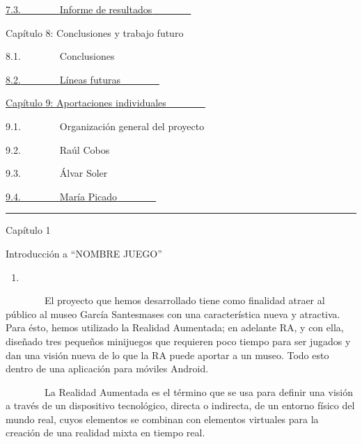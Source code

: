 \documentclass[]{article}
\begin{document}
\hyperref[h.1mrcu09]{7.3.}\hyperref[h.1mrcu09]{~~~~~~~~}\hyperref[h.1mrcu09]{Informe
de resultados}\hyperref[h.1mrcu09]{~~~~~~~~}

Capítulo 8: Conclusiones y trabajo futuro~~~~~~~~

8.1.~~~~~~~~Conclusiones~~~~~~~~

\hyperref[h.111kx3o]{8.2.}\hyperref[h.111kx3o]{~~~~~~~~}\hyperref[h.111kx3o]{Líneas
futuras}\hyperref[h.111kx3o]{~~~~~~~~}

\hyperref[h.3l18frh]{Capítulo 9: Aportaciones
individuales}\hyperref[h.3l18frh]{~~~~~~~~}

9.1.~~~~~~~~Organización general del proyecto~~~~~~~~

9.2.~~~~~~~~Raúl Cobos~~~~~~~~

9.3.~~~~~~~~Álvar Soler~~~~~~~~

\hyperref[h.1egqt2p]{9.4.}\hyperref[h.1egqt2p]{~~~~~~~~}\hyperref[h.1egqt2p]{María
Picado}\hyperref[h.1egqt2p]{~~~~~~~~}

\hyperref[h.1egqt2p]{}

\begin{center}\rule{3in}{0.4pt}\end{center}

\hyperref[h.1egqt2p]{}

\hyperref[h.1egqt2p]{}

Capítulo 1

Introducción a ``NOMBRE JUEGO''

\begin{enumerate}
\item
\end{enumerate}

~~~~~~~~El proyecto que hemos desarrollado tiene como finalidad atraer
al público al museo García Santesmases con una característica nueva y
atractiva. Para ésto, hemos utilizado la Realidad Aumentada; en adelante
RA, y con ella, diseñado tres pequeños minijuegos que requieren poco
tiempo para ser jugados y dan una visión nueva de lo que la RA puede
aportar a un museo. Todo esto dentro de una aplicación para móviles
Android.

~~~~~~~~La Realidad Aumentada es el término que se usa para definir una
visión a través de un dispositivo tecnológico, directa o indirecta, de
un entorno físico del mundo real, cuyos elementos se combinan con
elementos virtuales para la creación de una realidad mixta en tiempo
real. ~~~~~~~~~~~~~~~~~
\end{document}
